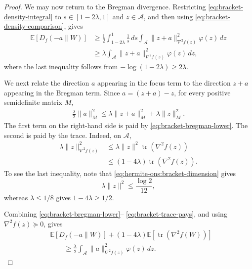 \documentclass{article}
\theoremstyle{plain}
\theoremstyle{definition}
\theoremstyle{plain}
\newcommand{\tr}{\operatorname{tr}}
\newcommand{\E}{\mathbb E}
\begin{document}
\begin{proof}
    We may now return to the Bregman divergence. Restricting
    \eqref{eq:bracket-density-integral} to
    $s\in[1-2\lambda,1]$ and $z\in\mathcal A$, and then using
    \eqref{eq:bracket-density-comparison}, gives
    \begin{align}
        \E[D_f(-a\|W)]
         & \geq
        \frac12
        \int_{1-2\lambda}^1\frac{1}{s}\,ds
        \int_{\mathcal A}
        \|z+a\|_{\nabla^2f(z)}^2
        \varphi(z)\,dz
        \nonumber \\
         & \geq
        \lambda
        \int_{\mathcal A}
        \|z+a\|_{\nabla^2f(z)}^2
        \varphi(z)\,dz,
        \label{eq:bracket-bregman-lower}
    \end{align}
    where the last inequality follows from
    $-\log(1-2\lambda)\geq2\lambda$.

    We next relate the direction $a$ appearing in the focus term to
    the direction $z+a$ appearing in the Bregman term. Since
    $a=(z+a)-z$, for every positive semidefinite matrix $M$,
    \begin{align}
        \frac{\lambda}{2}\|a\|_M^2
        \leq
        \lambda\|z+a\|_M^2
        +
        \lambda\|z\|_M^2.
        \label{eq:bracket-vector-comparison}
    \end{align}
    The first term on the right-hand side is paid by
    \eqref{eq:bracket-bregman-lower}. The second is paid by the trace.
    Indeed, on $\mathcal A$,
    \begin{align}
        \lambda\|z\|_{\nabla^2f(z)}^2
         & \leq
        \lambda\|z\|^2\tr(\nabla^2f(z))
        \nonumber \\
         & \leq
        (1-4\lambda)\tr(\nabla^2f(z)).
        \label{eq:bracket-trace-pays}
    \end{align}
    To see the last inequality, note that
    \eqref{eq:hermite-ons:bracket-dimension} gives
    \[
        \lambda\|z\|^2
        \leq\frac{\log2}{12},
    \]
    whereas $\lambda\leq1/8$ gives $1-4\lambda\geq1/2$.

    Combining
    \eqref{eq:bracket-bregman-lower}--%
    \eqref{eq:bracket-trace-pays}, and using
    $\nabla^2f(z)\succeq0$, gives
    \begin{align}
         & \E[D_f(-a\|W)]
        +(1-4\lambda)\E[\tr(\nabla^2f(W))]
        \nonumber         \\
         & \qquad\geq
        \frac{\lambda}{2}
        \int_{\mathcal A}
        \|a\|_{\nabla^2f(z)}^2
        \varphi(z)\,dz.
        \label{eq:bracket-inside-set}
    \end{align}


\end{proof}
\end{document}
